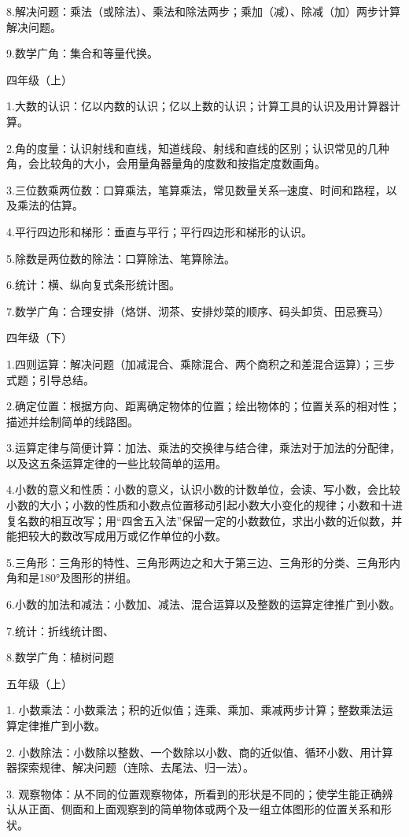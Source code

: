 8.解决问题：乘法（或除法）、乘法和除法两步；乘加（减）、除减（加）两步计算解决问题。

9.数学广角：集合和等量代换。

四年级（上）

1.大数的认识：亿以内数的认识；亿以上数的认识；计算工具的认识及用计算器计算。

2.角的度量：认识射线和直线，知道线段、射线和直线的区别；认识常见的几种角，会比较角的大小，会用量角器量角的度数和按指定度数画角。

3.三位数乘两位数：口算乘法，笔算乘法，常见数量关系─速度、时间和路程，以及乘法的估算。

4.平行四边形和梯形：垂直与平行；平行四边形和梯形的认识。

5.除数是两位数的除法：口算除法、笔算除法。

6.统计：横、纵向复式条形统计图。

7.数学广角：合理安排（烙饼、沏茶、安排炒菜的顺序、码头卸货、田忌赛马）

四年级（下）

1.四则运算：解决问题（加减混合、乘除混合、两个商积之和差混合运算）；三步式题；引导总结。

2.确定位置：根据方向、距离确定物体的位置；绘出物体的；位置关系的相对性；描述并绘制简单的线路图。

3.运算定律与简便计算：加法、乘法的交换律与结合律，乘法对于加法的分配律，以及这五条运算定律的一些比较简单的运用。

4.小数的意义和性质：小数的意义，认识小数的计数单位，会读、写小数，会比较小数的大小；小数的性质和小数点位置移动引起小数大小变化的规律；小数和十进复名数的相互改写；用“四舍五入法”保留一定的小数数位，求出小数的近似数，并能把较大的数改写成用万或亿作单位的小数。

5.三角形：三角形的特性、三角形两边之和大于第三边、三角形的分类、三角形内角和是180°及图形的拼组。

6.小数的加法和减法：小数加、减法、混合运算以及整数的运算定律推广到小数。

7.统计：折线统计图、

8.数学广角：植树问题

五年级（上）

1. 小数乘法：小数乘法；积的近似值；连乘、乘加、乘减两步计算；整数乘法运算定律推广到小数。

2. 小数除法：小数除以整数、一个数除以小数、商的近似值、循环小数、用计算器探索规律、解决问题（连除、去尾法、归一法）。

3. 观察物体：从不同的位置观察物体，所看到的形状是不同的；使学生能正确辨认从正面、侧面和上面观察到的简单物体或两个及一组立体图形的位置关系和形状。

